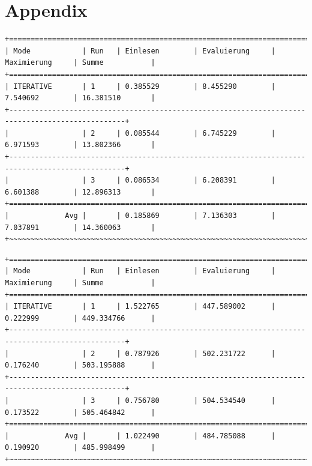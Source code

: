 \documentclass[draft,final]{vutinfth} %
\begin{document}
\chapter*{Appendix} \label{apendix}

\begin{lstlisting}[float,basicstyle=\tiny,caption={Benchmark ITERATIVE, Datei: lubm-ex-20-15.sparql.xml},label={lst:bi15raw}]
+=================================================================================================+
| Mode            | Run   | Einlesen        | Evaluierung     | Maximierung     | Summe           | 
+=================================================================================================+
| ITERATIVE       | 1     | 0.385529        | 8.455290        | 7.540692        | 16.381510       | 
+-------------------------------------------------------------------------------------------------+
|                 | 2     | 0.085544        | 6.745229        | 6.971593        | 13.802366       | 
+-------------------------------------------------------------------------------------------------+
|                 | 3     | 0.086534        | 6.208391        | 6.601388        | 12.896313       | 
+=================================================================================================+
|             Avg |       | 0.185869        | 7.136303        | 7.037891        | 14.360063       |
+~~~~~~~~~~~~~~~~~~~~~~~~~~~~~~~~~~~~~~~~~~~~~~~~~~~~~~~~~~~~~~~~~~~~~~~~~~~~~~~~~~~~~~~~~~~~~~~~~+
\end{lstlisting}

\begin{lstlisting}[float,basicstyle=\tiny,caption={Benchmark ITERATIVE, Datei: lubm-ex-20-17.sparql.xml},label={lst:bi17raw}]
+=================================================================================================+
| Mode            | Run   | Einlesen        | Evaluierung     | Maximierung     | Summe           | 
+=================================================================================================+
| ITERATIVE       | 1     | 1.522765        | 447.589002      | 0.222999        | 449.334766      | 
+-------------------------------------------------------------------------------------------------+
|                 | 2     | 0.787926        | 502.231722      | 0.176240        | 503.195888      | 
+-------------------------------------------------------------------------------------------------+
|                 | 3     | 0.756780        | 504.534540      | 0.173522        | 505.464842      | 
+=================================================================================================+
|             Avg |       | 1.022490        | 484.785088      | 0.190920        | 485.998499      |
+~~~~~~~~~~~~~~~~~~~~~~~~~~~~~~~~~~~~~~~~~~~~~~~~~~~~~~~~~~~~~~~~~~~~~~~~~~~~~~~~~~~~~~~~~~~~~~~~~+
\end{lstlisting}
\end{document}
